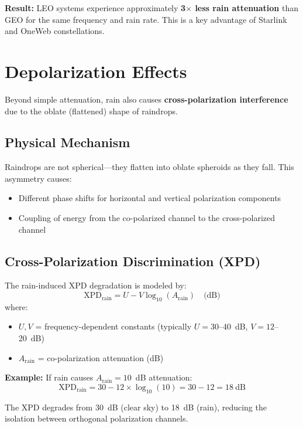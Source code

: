 \textbf{Result:} LEO systems experience approximately \textbf{3$\times$ less rain attenuation} than GEO for the same frequency and rain rate. This is a key advantage of Starlink and OneWeb constellations.

\section{Depolarization Effects}

Beyond simple attenuation, rain also causes \textbf{cross-polarization interference} due to the oblate (flattened) shape of raindrops.

\subsection{Physical Mechanism}

Raindrops are not spherical---they flatten into oblate spheroids as they fall. This asymmetry causes:
\begin{itemize}
\item Different phase shifts for horizontal and vertical polarization components
\item Coupling of energy from the co-polarized channel to the cross-polarized channel
\end{itemize}

\subsection{Cross-Polarization Discrimination (XPD)}

The rain-induced XPD degradation is modeled by:
\begin{equation}
\text{XPD}_{\text{rain}} = U - V \log_{10}(A_{\text{rain}}) \quad \text{(dB)}
\label{eq:xpd-rain}
\end{equation}
where:
\begin{itemize}
\item $U, V$ = frequency-dependent constants (typically $U = 30$--40~dB, $V = 12$--20~dB)
\item $A_{\text{rain}}$ = co-polarization attenuation (dB)
\end{itemize}

\textbf{Example:} If rain causes $A_{\text{rain}} = 10$~dB attenuation:
\begin{equation}
\text{XPD}_{\text{rain}} = 30 - 12 \times \log_{10}(10) = 30 - 12 = 18~\text{dB}
\end{equation}

The XPD degrades from 30~dB (clear sky) to 18~dB (rain), reducing the isolation between orthogonal polarization channels.

